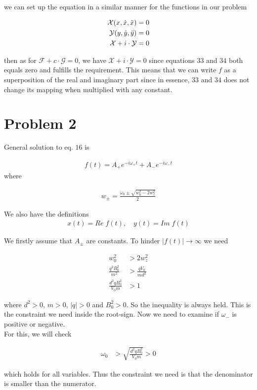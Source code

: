 \documentclass[english,notitlepage]{revtex4-1}  %
\begin{document}
we can set up the equation in a similar manner for the functions in our problem 

\begin{align}
    \mathcal{X}( x, \Dot{x}, \Ddot{x}) &= 0
    \\
    \mathcal{Y}( y, \Dot{y}, \Ddot{y}) &= 0
    \\
    \mathcal{X} + i \cdot \mathcal{Y} &= 0
\end{align}

then as for $\mathcal{F} + c \cdot \mathcal{G} = 0$, we have 
$\mathcal{X} + i \cdot \mathcal{Y} = 0$ since equations $33$ and $34$ both equals zero and fulfills the requirement. This means that we can write $f$ as a superposition of the real and imaginary part since in essence, $33$ and $34$ does not change its mapping when multiplied with any constant. 


\section*{Problem 2}

General solution to eq. $16$ is 

\begin{align}
    f(t) = A_{+} e^{-i\omega_{+}t} + A_{-} e^{-i\omega_{-}t}
\end{align}
where

\begin{align}
    w_{\pm} = \frac{\omega_0 \pm \sqrt{w_0^2 - 2w_z^2}}{2}
\end{align}

We also have the definitions
\begin{align}
    x(t) = Re\;f(t), \quad y(t) = Im \; f(t)
\end{align}

We firstly assume that $A_{\pm}$ are constants. To hinder $|f(t)| \rightarrow \infty$ we need 

\begin{align}
    w_0^2 &> 2w_z^2
    \\
    \frac{q^2 B_0^2}{m^2} &> \frac{q V_0}{md^2}
    \\
    \frac{d^2 q B_0^2}{V_0 m} &> 1
\end{align}

where $d^2 > 0$, $m > 0$, $|q| > 0$ and $B_0^2 > 0$. So the inequality is always held. This is the constraint we need inside the root-sign. Now we need to examine if $\omega_{-}$ is positive or negative. 
\\
For this, we will check 

\begin{align}
    \omega_0 &> \sqrt{\frac{d^2 q B_0^2}{V_0 m}} > 0
\end{align}

which holds for all variables. Thus the constraint we need is that the denominator is smaller than the numerator.
\end{document}
